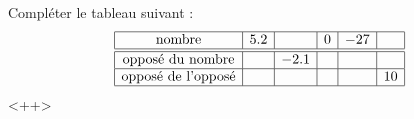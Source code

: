 
\begin{exercice}\label{exosmath-0724}

    Compléter le tableau suivant :
    \begin{equation*}
        \begin{array}[]{|c|c|c|c|c|c|}
            \hline
            \text{nombre}&5.2&&0&-27&\\
            \hline\hline
            \text{opposé du nombre}&&-2.1&&&\\
            \hline
            \text{opposé de l'opposé}&&&&&10\\
            \hline
        \end{array}
    \end{equation*}
    <++>

\end{exercice}
